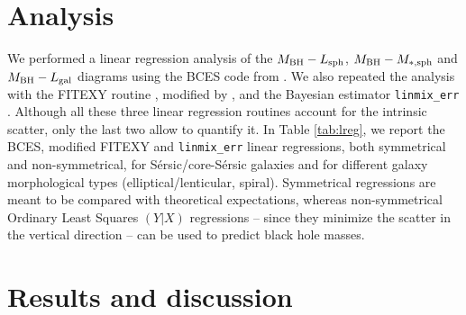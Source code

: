 \documentclass[preprint2]{emulateapj}
\begin{document}
\section{Analysis}
\label{sec:anal}
We performed a linear regression analysis of the $M_{\rm BH} - L_{\rm sph}$, $M_{\rm BH} - M_{\rm *,sph}$ and $M_{\rm BH} - L_{\rm gal}$ diagrams 
using the BCES code from \cite{akritasbershady1996}. 
We also repeated the analysis with the FITEXY routine \citep{press1992}, modified by \cite{tremaine2002}, 
and the Bayesian estimator {\tt linmix\_err} \citep{linmixerr}. 
Although all these three linear regression routines account for the intrinsic scatter, 
only the last two allow to quantify it.
In Table \ref{tab:lreg}, we report the BCES, modified FITEXY and {\tt linmix\_err} linear regressions, both symmetrical and non-symmetrical, 
for S\'ersic/core-S\'ersic galaxies and for different galaxy morphological types (elliptical/lenticular, spiral).
Symmetrical regressions are meant to be compared with theoretical expectations, 
whereas non-symmetrical Ordinary Least Squares $(Y|X)$ regressions -- 
since they minimize the scatter in the vertical direction -- 
can be used to predict black hole masses.

\section{Results and discussion}
\label{sec:res}
\end{document}
